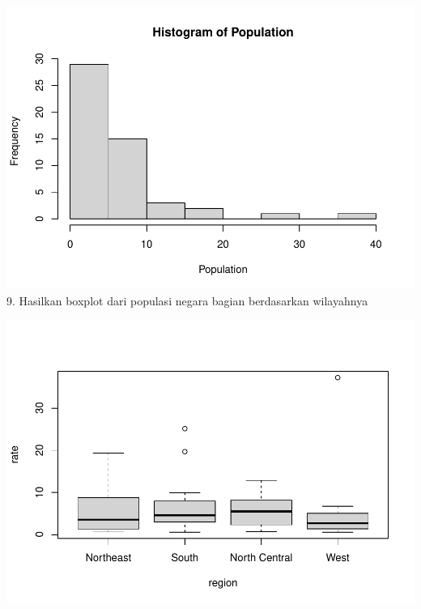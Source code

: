 \documentclass[
]{article}
\newenvironment{Shaded}{\begin{snugshade}}{\end{snugshade}}
\newcommand{\AttributeTok}[1]{\textcolor[rgb]{0.77,0.63,0.00}{#1}}
\newcommand{\DecValTok}[1]{\textcolor[rgb]{0.00,0.00,0.81}{#1}}
\newcommand{\FunctionTok}[1]{\textcolor[rgb]{0.00,0.00,0.00}{#1}}
\newcommand{\NormalTok}[1]{#1}
\newcommand{\OtherTok}[1]{\textcolor[rgb]{0.56,0.35,0.01}{#1}}
\newcommand{\SpecialCharTok}[1]{\textcolor[rgb]{0.00,0.00,0.00}{#1}}
\begin{document}
\begin{Shaded}
\end{Shaded}

\includegraphics{Latihan3_123190027_files/figure-latex/unnamed-chunk-10-1.pdf}
9. Hasilkan boxplot dari populasi negara bagian berdasarkan wilayahnya

\begin{Shaded}
\end{Shaded}

\includegraphics{Latihan3_123190027_files/figure-latex/unnamed-chunk-11-1.pdf}
\end{document}
